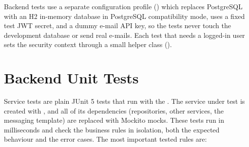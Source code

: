 Backend tests use a separate configuration profile ()
which replaces PostgreSQL with an H2 in-memory database in PostgreSQL compatibility mode,
uses a fixed test JWT secret, and a dummy e-mail API key, so the tests never touch the
development database or send real e-mails. Each test that needs a logged-in user sets the
security context through a small helper class ().

\section{Backend Unit Tests}

Service tests are plain JUnit 5 tests that run with the . The
service under test is created with , and all of its dependencies
(repositories, other services, the messaging template) are replaced with Mockito mocks.
These tests run in milliseconds and check the business rules in isolation, both the
expected behaviour and the error cases. The most important tested rules are:

